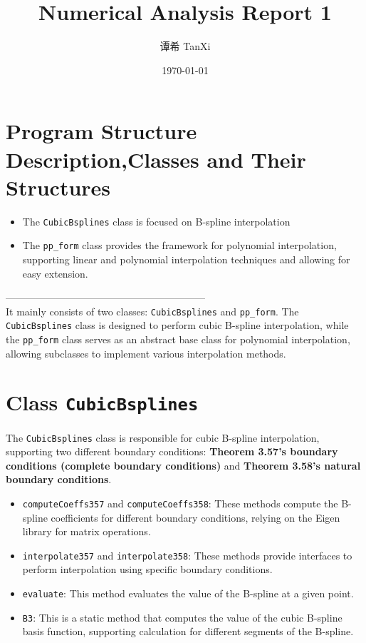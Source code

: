 \documentclass[a4paper]{article}
\title{Numerical Analysis Report 1}
\author[1]{谭希 TanXi}
\affil[1]{Zhejiang University, Email: \texttt{3220100027@zju.edu.cn}}
\date{\today}
\begin{document}
\maketitle

\section*{Program Structure Description,Classes and Their Structures}

\begin{itemize}
    \item The \texttt{CubicBsplines} class is focused on B-spline interpolation
    \item The \texttt{pp\_form} class provides the framework for polynomial interpolation, supporting linear and polynomial interpolation techniques and allowing for easy extension.
\end{itemize}
------------------------------------------------------------\\
 It mainly consists of two classes: \texttt{CubicBsplines} and \texttt{pp\_form}. The \texttt{CubicBsplines} class is designed to perform cubic B-spline interpolation, while the \texttt{pp\_form} class serves as an abstract base class for polynomial interpolation, allowing subclasses to implement various interpolation methods.

\section{Class \texttt{CubicBsplines}}

The \texttt{CubicBsplines} class is responsible for cubic B-spline interpolation, supporting two different boundary conditions: \textbf{Theorem 3.57's boundary conditions (complete boundary conditions)} and \textbf{Theorem 3.58's natural boundary conditions}.

\begin{itemize}
    \item \texttt{computeCoeffs357} and \texttt{computeCoeffs358}: These methods compute the B-spline coefficients for different boundary conditions, relying on the Eigen library for matrix operations.
    \item \texttt{interpolate357} and \texttt{interpolate358}: These methods provide interfaces to perform interpolation using specific boundary conditions.
    \item \texttt{evaluate}: This method evaluates the value of the B-spline at a given point.
    \item \texttt{B3}: This is a static method that computes the value of the cubic B-spline basis function, supporting calculation for different segments of the B-spline.
\end{itemize}
\end{document}

